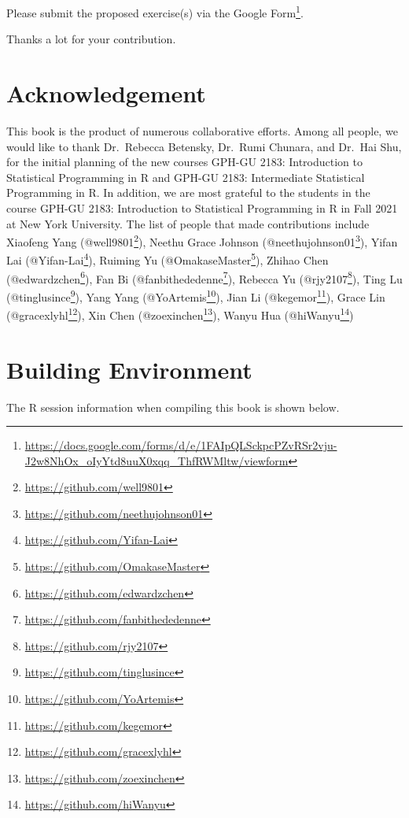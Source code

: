 \documentclass[
]{book}
\renewcommand{\href}[2]{#2\footnote{\url{#1}}}
\begin{document}
Please submit the proposed exercise(s) via the \href{https://docs.google.com/forms/d/e/1FAIpQLSckpcPZvRSr2vju-J2w8NhOx_oIyYtd8uuX0xqq_ThfRWMltw/viewform}{Google Form}.

Thanks a lot for your contribution.

\hypertarget{acknowledgement}{%
\chapter*{Acknowledgement}\label{acknowledgement}}

This book is the product of numerous collaborative efforts. Among all people, we would like to thank Dr.~Rebecca Betensky, Dr.~Rumi Chunara, and Dr.~Hai Shu, for the initial planning of the new courses GPH-GU 2183: Introduction to Statistical Programming in R and GPH-GU 2183: Intermediate Statistical Programming in R. In addition, we
are most grateful to the students in the course GPH-GU 2183: Introduction to Statistical Programming in R in Fall 2021 at New York University. The list of people that made contributions include Xiaofeng Yang (\href{https://github.com/well9801}{@well9801}), Neethu Grace Johnson (\href{https://github.com/neethujohnson01}{@neethujohnson01}), Yifan Lai (\href{https://github.com/Yifan-Lai}{@Yifan-Lai}), Ruiming Yu (\href{https://github.com/OmakaseMaster}{@OmakaseMaster}), Zhihao Chen (\href{https://github.com/edwardzchen}{@edwardzchen}), Fan Bi (\href{https://github.com/fanbithededenne}{@fanbithededenne}), Rebecca Yu (\href{https://github.com/rjy2107}{@rjy2107}), Ting Lu (\href{https://github.com/tinglusince}{@tinglusince}), Yang Yang (\href{https://github.com/YoArtemis}{@YoArtemis}), Jian Li (\href{https://github.com/kegemor}{@kegemor}), Grace Lin (\href{https://github.com/gracexlyhl}{@gracexlyhl}), Xin Chen (\href{https://github.com/zoexinchen}{@zoexinchen}), Wanyu Hua (\href{https://github.com/hiWanyu}{@hiWanyu})

\hypertarget{building-environment}{%
\chapter*{Building Environment}\label{building-environment}}

The R session information when compiling this book is shown below.
\end{document}
